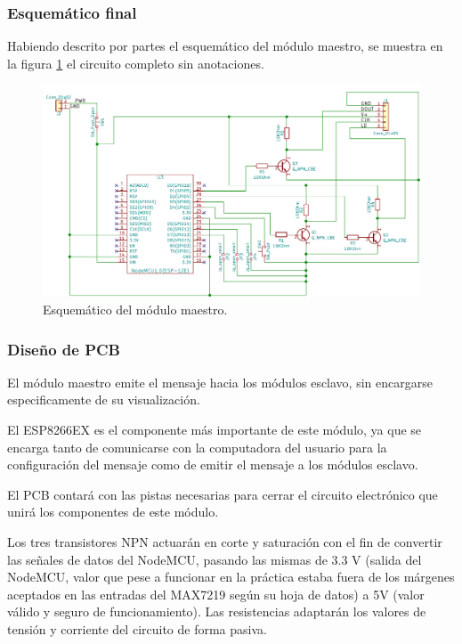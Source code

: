 \subsubsection{Esquemático final}
Habiendo descrito por partes el esquemático del módulo maestro, se muestra en la figura \ref{fig:esquematico-master} el circuito completo sin anotaciones.

\begin{figure}[ht!]
	\centering
	\includegraphics[width=\linewidth]{imagenes/esquematico-master.pdf}
	\caption{Esquemático del módulo maestro.}
	\label{fig:esquematico-master}
\end{figure}

\subsubsection{Diseño de PCB}

El módulo maestro emite el mensaje hacia los módulos esclavo, sin encargarse especificamente de su visualización.

El ESP8266EX es el componente más importante de este módulo, ya que se encarga tanto de comunicarse con la computadora del usuario para la configuración del mensaje como de emitir el mensaje a los módulos esclavo.

El PCB contará con las pistas necesarias para cerrar el circuito electrónico que unirá los componentes de este módulo.

Los tres transistores NPN actuarán en corte y saturación con el fin de convertir las señales de datos del NodeMCU, pasando las mismas de 3.3 V (salida del NodeMCU, valor que pese a funcionar en la práctica estaba fuera de los márgenes aceptados en las entradas del MAX7219 según su hoja de datos) a 5V (valor válido y seguro de funcionamiento). Las resistencias adaptarán los valores de tensión y corriente del circuito de forma pasiva.

